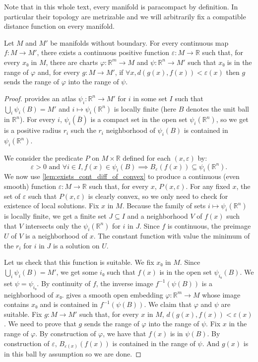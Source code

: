 Note that in this whole text, every manifold is paracompact by definition. In
particular their topology are metrizable and we will arbitrarily fix a
compatible distance function on every manifold.

\begin{lemma}
  Let $M$ and $M'$ be manifolds without boundary. For every continuous map
  $f : M → M'$, there exists a continuous positive function $ε : M → ℝ$ such
  that, for every $x₀$ in $M$, there are charts $φ : ℝ^m → M$ and $ψ : ℝ^n → M'$
  such that $x₀$ is in the range of $φ$ and, for every $g : M → M'$,
  if $∀ x, d(g(x), f(x)) < ε(x)$ then $g$ sends the range of $φ$ into the range
  of $ψ$.
\end{lemma}

\begin{proof}
   provides an atlas $ψ_i : ℝ^n → M'$ for $i$ in some set
  $I$ such that $\bigcup_i ψ_i(B) = M'$ and $i ↦ ψ_i(ℝ^n)$ is locally finite
  (here $B$ denotes the unit ball in $ℝ^n$).
  For every $i$, $ψ_i(\bar B)$ is a compact set in the open set $ψ_i(ℝ^n)$, so
  we get is a positive radius $r_i$ such the $r_i$ neighborhood of
  $ψ_i(B)$ is contained in $ψ_i(ℝ^n)$.

  We consider the predicate $P$ on $M × ℝ$ defined for each $(x, ε)$ by:
  \[
    ε > 0 \text{ and } ∀ i ∈ I, f(x) ∈ ψ_i(B) \implies B_ε(f(x)) ⊆ ψ_i(ℝ^n).
  \]
  We now use \cref{lem:exists_cont_diff_of_convex} to produce a
  continuous (even smooth) function $ε : M → ℝ$ such that, for every $x$,
  $P(x, ε)$.
  For any fixed $x$, the set of $ε$ such that $P(x, ε)$ is clearly convex, so we
  only need to check for existence of local solutions. Fix $x$ in $M$.
  Because the family of sets $i ↦ ψ_i(ℝ^n)$ is locally finite, we get a finite
  set $J ⊆ I$ and a neighborhood $V$ of $f(x)$ such that $V$ intersects only
  the $ψ_i(ℝ^n)$ for $i$ in $J$. Since $f$ is continuous, the preimage
  $U$ of $V$ is a neighborhood of $x$. The constant function with value
  the minimum of the $r_i$ for $i$ in $J$ is a solution on $U$. 

  Let us check that this function is suitable. We fix $x₀$ in $M$.
  Since $\bigcup_i ψ_i(B) = M'$, we get some $i₀$ such that
  $f(x)$ is in the open set $ψ_{i₀}(B)$. 
  We set $ψ = ψ_{i₀}$. 
  By continuity of $f$, the inverse image $f^{-1}(ψ(B))$ is a neighborhood
  of $x₀$.
   gives a smooth open embedding 
  $φ : ℝ^m → M$ whose image contains $x₀$ and is contained in $f^{-1}(ψ(B))$. 
  We claim that $φ$ and $ψ$ are suitable.
  Fix $g : M → M'$ such that, for every $x$ in $M$, $d(g(x), f(x)) < ε(x)$.
  We need to prove that $g$ sends the range of $φ$ into the range of $ψ$.
  Fix $x$ in the range of $φ$. 
  By construction of $φ$, we have that $f(x)$ is in $ψ(B)$.
  By construction of $ε$, $B_{ε(x)}(f(x))$ is contained in the range of $ψ$.
  And $g(x)$ is in this ball by assumption so we are done.
\end{proof}

